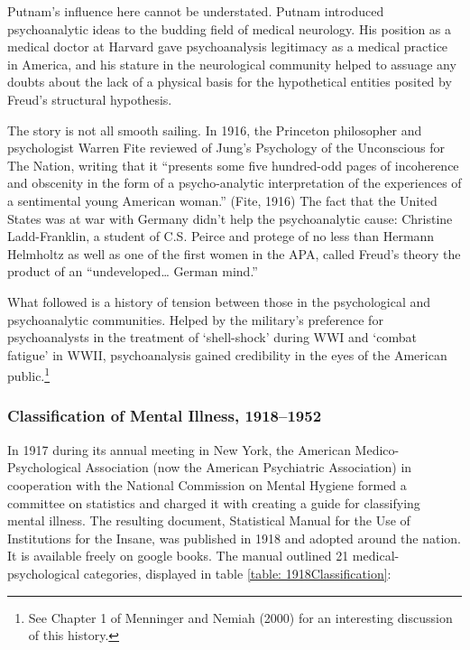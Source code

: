 Putnam's influence here cannot be understated. Putnam introduced psychoanalytic ideas to the budding field of medical neurology. His position as a medical doctor at Harvard gave psychoanalysis legitimacy as a medical practice in America, and his stature in the neurological community helped to assuage any doubts about the lack of a physical basis for the hypothetical entities posited by Freud's structural hypothesis.

The story is not all smooth sailing. In 1916, the Princeton philosopher and psychologist Warren Fite reviewed of Jung's Psychology of the Unconscious for The Nation, writing that it ``presents some five hundred-odd pages of incoherence and obscenity in the form of a psycho-analytic interpretation of the experiences of a sentimental young American woman.'' (Fite, 1916) The fact that the United States was at war with Germany didn't help the psychoanalytic cause: Christine Ladd-Franklin, a student of C.S. Peirce and protege of no less than Hermann Helmholtz as well as one of the first women in the APA, called Freud's theory the product of an ``undeveloped{\ldots} German mind.''

What followed is a history of tension between those in the psychological and psychoanalytic communities. Helped by the military's preference for psychoanalysts in the treatment of `shell-shock' during WWI and `combat fatigue' in WWII, psychoanalysis gained credibility in the eyes of the American public.\footnote{See Chapter 1 of Menninger and Nemiah (2000) for an interesting discussion of this history.}

\subsubsection{Classification of Mental Illness, 1918--1952}
\label{classificationofmentalillness1918-1952}

In 1917 during its annual meeting in New York, the American Medico-Psychological Association (now the American Psychiatric Association) in cooperation with the National Commission on Mental Hygiene formed a committee on statistics and charged it with creating a guide for classifying mental illness. The resulting document, Statistical Manual for the Use of Institutions for the Insane, was published in 1918 and adopted around the nation. It is available freely on google books. The manual outlined 21 medical-psychological categories, displayed in table \ref{table: 1918Classification}:

